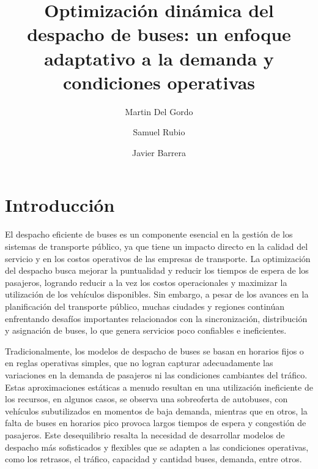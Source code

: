 \documentclass[preprint,11pt]{elsarticle}
\begin{document}
\begin{frontmatter}

\title{Optimización dinámica del despacho de buses: un enfoque adaptativo a la demanda y condiciones operativas}


\author[label1]{Martin Del Gordo}
\address[label1]{Departamento de Ingenier\'ia Industrial, Universidad de Los Andes, Colombia}

\author[label1]{Samuel Rubio}

\author[label1]{Javier Barrera}





\end{frontmatter}

\linenumbers
\section{Introducción}
\vspace{-1mm}
\label{Int}

El despacho eficiente de buses es un componente esencial en la gestión de los sistemas de transporte público, ya que tiene un impacto directo en la calidad del servicio y en los costos operativos de las empresas de transporte. La optimización del despacho busca mejorar la puntualidad y reducir los tiempos de espera de los pasajeros, logrando reducir a la vez los costos operacionales y maximizar la utilización de los vehículos disponibles. Sin embargo, a pesar de los avances en la planificación del transporte público, muchas ciudades y regiones continúan enfrentando desafíos importantes relacionados con la sincronización, distribución y asignación de buses, lo que genera servicios poco confiables e ineficientes. 

Tradicionalmente, los modelos de despacho de buses se basan en horarios fijos o en reglas operativas simples, que no logran capturar adecuadamente las variaciones en la demanda de pasajeros ni las condiciones cambiantes del tráfico. Estas aproximaciones estáticas a menudo resultan en una utilización ineficiente de los recursos, en algunos casos, se observa una sobreoferta de autobuses, con vehículos subutilizados en momentos de baja demanda, mientras que en otros, la falta de buses en horarios pico provoca largos tiempos de espera y congestión de pasajeros. Este desequilibrio resalta la necesidad de desarrollar modelos de despacho más sofisticados y flexibles que se adapten a las condiciones operativas, como los retrasos, el tráfico, capacidad y cantidad buses, demanda, entre otros. 
\end{document}
